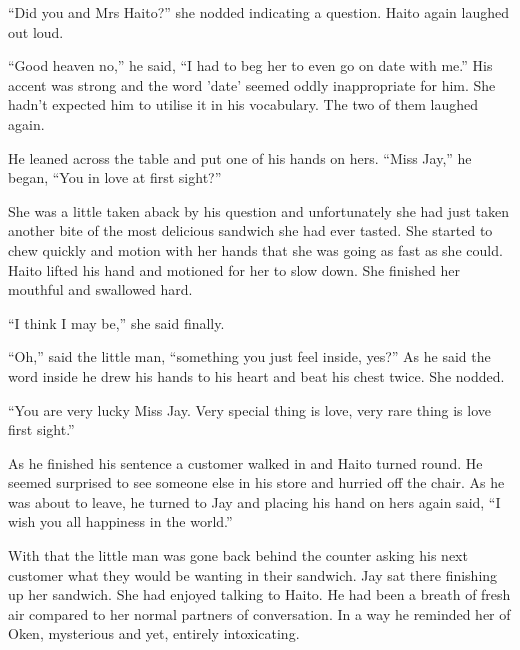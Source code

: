 ``Did you and Mrs Haito?'' she nodded indicating a question.  Haito again laughed out loud.  

``Good heaven no,'' he said, ``I had to beg her to even go on date with me.''  His accent was strong and the word 'date' seemed oddly inappropriate for him.  She hadn't expected him to utilise it in his vocabulary.  The two of them laughed again.  

He leaned across the table and put one of his hands on hers.  ``Miss Jay,'' he began, ``You in love at first sight?''

She was a little taken aback by his question and unfortunately she had just taken another bite of the most delicious sandwich she had ever tasted.  She started to chew quickly and motion with her hands that she was going as fast as she could.  Haito lifted his hand and motioned for her to slow down.  She finished her mouthful and swallowed hard.

``I think I may be,'' she said finally.

``Oh,'' said the little man, ``something you just feel inside, yes?''  As he said the word inside he drew his hands to his heart and beat his chest twice.  She nodded.

``You are very lucky Miss Jay.  Very special thing is love, very rare thing is love first sight.''

As he finished his sentence a customer walked in and Haito turned round.  He seemed surprised to see someone else in his store and hurried off the chair.  As he was about to leave, he turned to Jay and placing his hand on hers again said, ``I wish you all happiness in the world.''

With that the little man was gone back behind the counter asking his next customer what they would be wanting in their sandwich.  Jay sat there finishing up her sandwich.  She had enjoyed talking to Haito.  He had been a breath of fresh air compared to her normal partners of conversation.  In a way he reminded her of Oken, mysterious and yet, entirely intoxicating.





